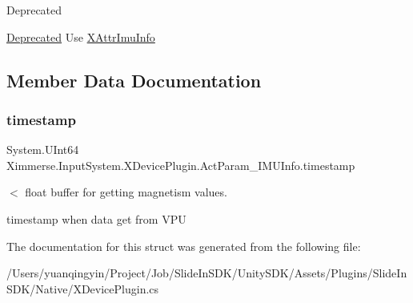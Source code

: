 \begin{DoxyRefDesc}{Deprecated}
\item[\mbox{\hyperlink{deprecated__deprecated000002}{Deprecated}}]Use \mbox{\hyperlink{struct_ximmerse_1_1_input_system_1_1_x_device_plugin_1_1_x_attr_imu_info}{X\+Attr\+Imu\+Info}} \end{DoxyRefDesc}


\subsection{Member Data Documentation}
\mbox{\label{struct_ximmerse_1_1_input_system_1_1_x_device_plugin_1_1_act_param___i_m_u_info_a937f5d19f1c3d91774a83f1421a26dc4}} 
\subsubsection{\texorpdfstring{timestamp}{timestamp}}
{\footnotesize\ttfamily System.\+U\+Int64 Ximmerse.\+Input\+System.\+X\+Device\+Plugin.\+Act\+Param\+\_\+\+I\+M\+U\+Info.\+timestamp}



$<$ float buffer for getting magnetism values. 

timestamp when data get from V\+PU 

The documentation for this struct was generated from the following file\+:\begin{DoxyCompactItemize}
\item 
/\+Users/yuanqingyin/\+Project/\+Job/\+Slide\+In\+S\+D\+K/\+Unity\+S\+D\+K/\+Assets/\+Plugins/\+Slide\+In\+S\+D\+K/\+Native/X\+Device\+Plugin.\+cs\end{DoxyCompactItemize}
